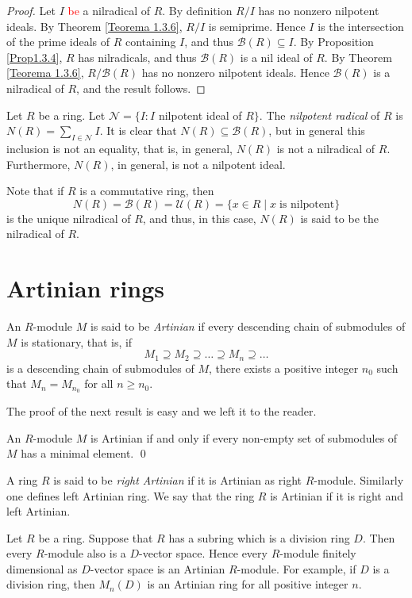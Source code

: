 \begin{proof}
Let $I$ \textcolor{red}{be} a nilradical of $R$. By definition $R/I$ has no nonzero nilpotent ideals. By Theorem \ref{Teorema 1.3.6}, $R/I$ is semiprime. Hence
$I$  is the intersection of the prime ideals of $R$ containing $I$, and thus $\mathcal{B}(R)\subseteq I$. By Proposition \ref{Prop1.3.4}, $R$ has nilradicals, and thus $\mathcal{B}(R)$ is a nil ideal of $R$. By Theorem \ref{Teorema 1.3.6}, $R/\mathcal{B}(R)$ has no nonzero nilpotent ideals. Hence $\mathcal{B}(R)$ is a nilradical of $R$, and the result follows.
\end{proof}

Let $R$ be a ring. Let $\mathcal{N}=\{ I : I$ nilpotent ideal of $R\}$. The \emph{nilpotent radical} of $R$ is
$N(R)=\sum_{I\in\mathcal{N}} I$. It is clear that $N(R)\subseteq \mathcal{B}(R)$, but in general this inclusion is not an equality, 
that is, in general, $N(R)$ is not a nilradical of $R$. Furthermore,
$N(R)$, in general, is not a nilpotent ideal.

Note that if $R$ is a commutative ring, then
$$N(R)=\mathcal{B}(R)=\mathcal{U}(R)=\{ x\in R\mid x\;\mbox{is nilpotent}\}$$
is the unique nilradical of $R$, and thus, in this case,  $N(R)$ is said to be the nilradical of $R$.

\section{Artinian rings}
An $R$-module $M$ is said to be \emph{Artinian} if every descending chain of submodules of $M$ is stationary, that is, if
$$M_1\supseteq M_2\supseteq\dots\supseteq M_n\supseteq\dots$$
is a descending chain of submodules of $M$, there exists a positive integer $n_0$ such that $M_n=M_{n_0}$ for all $n\geq n_0$.

The proof of the next result is easy and we left it to the reader.

\begin{proposition}\label{Prop1.4.1}
An $R$-module $M$ is Artinian if and only if every non-empty set of submodules of $M$ has a minimal element. \qed
\end{proposition}

A ring $R$ is said to be \emph{right Artinian} if it is Artinian as right $R$-module.
Similarly one defines left Artinian ring. We say that the ring $R$ is Artinian if it is right and left Artinian.

\begin{example}
Let $R$ be a ring. Suppose that $R$ has a subring which is a division ring $D$. Then every $R$-module also is a $D$-vector space. Hence every $R$-module finitely dimensional as $D$-vector space
is an Artinian $R$-module.
For example, if $D$ is a division ring, then $M_n(D)$ is an Artinian ring for all positive integer $n$.
\end{example}


